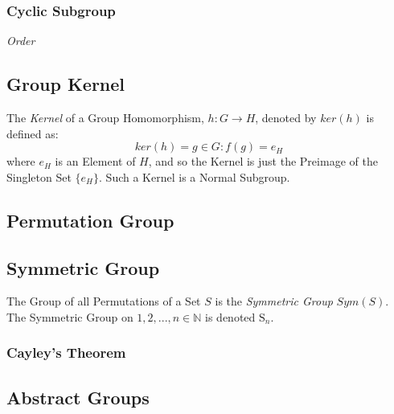 \subsubsection{Cyclic Subgroup}\label{subsec:cyclic_subgroup}

\emph{Order}



\subsection{Group Kernel}\label{subsec:group_kernel}

The \emph{Kernel} of a Group Homomorphism, $h : G \rightarrow H$,
denoted by $ker(h)$ is defined as:
\[
    ker(h) = {g \in G : f(g) = e_H}
\]
where $e_H$ is an Element of $H$, and so the Kernel is just the
Preimage of the Singleton Set $\{e_H\}$. Such a Kernel is a Normal
Subgroup.



\subsection{Permutation Group}\label{subsec:permutation_group}

\subsection{Symmetric Group}\label{subsec:symmetric_group}

The Group of all Permutations of a Set $S$ is the \emph{Symmetric
  Group} $Sym(S)$. The Symmetric Group on ${1, 2, ..., n} \in
\mathbb{N}$ is denoted $\mathrm{S}_n$.

\subsubsection{Cayley's Theorem}\label{subsec:cayleys_theorem}



\subsection{Abstract Groups}\label{subsec:abstract_groups}



